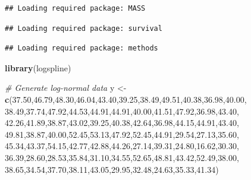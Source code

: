 \documentclass[english,10pt,a4paper,oneside]{book}
\newenvironment{Shaded}{\begin{snugshade}}{\end{snugshade}}
\newcommand{\CommentTok}[1]{\textcolor[rgb]{0.56,0.35,0.01}{\textit{#1}}}
\newcommand{\FloatTok}[1]{\textcolor[rgb]{0.00,0.00,0.81}{#1}}
\newcommand{\KeywordTok}[1]{\textcolor[rgb]{0.13,0.29,0.53}{\textbf{#1}}}
\newcommand{\NormalTok}[1]{#1}
\newcommand{\StringTok}[1]{\textcolor[rgb]{0.31,0.60,0.02}{#1}}
\theoremstyle{definition}
\theoremstyle{definition}
\theoremstyle{definition}
\theoremstyle{remark}
\begin{document}
\begin{verbatim}
## Loading required package: MASS
\end{verbatim}

\begin{verbatim}
## Loading required package: survival
\end{verbatim}

\begin{verbatim}
## Loading required package: methods
\end{verbatim}

\begin{Shaded}
\begin{Highlighting}[]
\KeywordTok{library}\NormalTok{(logspline)}

\CommentTok{# Generate log-normal data}
\NormalTok{y <-}\StringTok{ }\KeywordTok{c}\NormalTok{(}\FloatTok{37.50}\NormalTok{,}\FloatTok{46.79}\NormalTok{,}\FloatTok{48.30}\NormalTok{,}\FloatTok{46.04}\NormalTok{,}\FloatTok{43.40}\NormalTok{,}\FloatTok{39.25}\NormalTok{,}\FloatTok{38.49}\NormalTok{,}\FloatTok{49.51}\NormalTok{,}\FloatTok{40.38}\NormalTok{,}\FloatTok{36.98}\NormalTok{,}\FloatTok{40.00}\NormalTok{,}
\FloatTok{38.49}\NormalTok{,}\FloatTok{37.74}\NormalTok{,}\FloatTok{47.92}\NormalTok{,}\FloatTok{44.53}\NormalTok{,}\FloatTok{44.91}\NormalTok{,}\FloatTok{44.91}\NormalTok{,}\FloatTok{40.00}\NormalTok{,}\FloatTok{41.51}\NormalTok{,}\FloatTok{47.92}\NormalTok{,}\FloatTok{36.98}\NormalTok{,}\FloatTok{43.40}\NormalTok{,}
\FloatTok{42.26}\NormalTok{,}\FloatTok{41.89}\NormalTok{,}\FloatTok{38.87}\NormalTok{,}\FloatTok{43.02}\NormalTok{,}\FloatTok{39.25}\NormalTok{,}\FloatTok{40.38}\NormalTok{,}\FloatTok{42.64}\NormalTok{,}\FloatTok{36.98}\NormalTok{,}\FloatTok{44.15}\NormalTok{,}\FloatTok{44.91}\NormalTok{,}\FloatTok{43.40}\NormalTok{,}
\FloatTok{49.81}\NormalTok{,}\FloatTok{38.87}\NormalTok{,}\FloatTok{40.00}\NormalTok{,}\FloatTok{52.45}\NormalTok{,}\FloatTok{53.13}\NormalTok{,}\FloatTok{47.92}\NormalTok{,}\FloatTok{52.45}\NormalTok{,}\FloatTok{44.91}\NormalTok{,}\FloatTok{29.54}\NormalTok{,}\FloatTok{27.13}\NormalTok{,}\FloatTok{35.60}\NormalTok{,}
\FloatTok{45.34}\NormalTok{,}\FloatTok{43.37}\NormalTok{,}\FloatTok{54.15}\NormalTok{,}\FloatTok{42.77}\NormalTok{,}\FloatTok{42.88}\NormalTok{,}\FloatTok{44.26}\NormalTok{,}\FloatTok{27.14}\NormalTok{,}\FloatTok{39.31}\NormalTok{,}\FloatTok{24.80}\NormalTok{,}\FloatTok{16.62}\NormalTok{,}\FloatTok{30.30}\NormalTok{,}
\FloatTok{36.39}\NormalTok{,}\FloatTok{28.60}\NormalTok{,}\FloatTok{28.53}\NormalTok{,}\FloatTok{35.84}\NormalTok{,}\FloatTok{31.10}\NormalTok{,}\FloatTok{34.55}\NormalTok{,}\FloatTok{52.65}\NormalTok{,}\FloatTok{48.81}\NormalTok{,}\FloatTok{43.42}\NormalTok{,}\FloatTok{52.49}\NormalTok{,}\FloatTok{38.00}\NormalTok{,}
\FloatTok{38.65}\NormalTok{,}\FloatTok{34.54}\NormalTok{,}\FloatTok{37.70}\NormalTok{,}\FloatTok{38.11}\NormalTok{,}\FloatTok{43.05}\NormalTok{,}\FloatTok{29.95}\NormalTok{,}\FloatTok{32.48}\NormalTok{,}\FloatTok{24.63}\NormalTok{,}\FloatTok{35.33}\NormalTok{,}\FloatTok{41.34}\NormalTok{)}


\end{Highlighting}
\end{Shaded}
\end{document}
